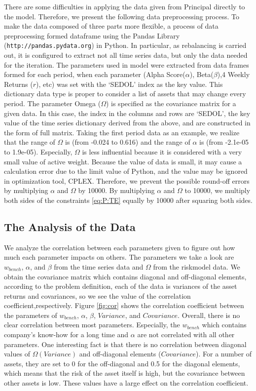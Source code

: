 \documentclass[11pt]{article}
\begin{document}
	There are some difficulties in applying the data given from Principal directly to the model. Therefore, we present the following data preprocessing process. To make the data composed of three parts more flexible, a process of data preprocessing formed dataframe using the Pandas Library (\texttt{http://pandas.pydata.org}) in Python. In particular, as rebalancing is carried out, it is configured to extract not all time series data, but only the data needed for the iteration. The parameters used in model were extracted from data frames formed for each period, when each parameter (Alpha Score($\alpha$), Beta($\beta$),4 Weekly Returns ($r$), etc) was set with the `SEDOL' index as the key value. This dictionary data type is proper to consider a list of assets that may change every period. The parameter Omega ($ \Omega $) is specified as the covariance matrix for a given data. In this case, the index in the columns and rows are `SEDOL', the key value of the time series dictionary derived from the above, and are constructed in the form of full matrix. Taking the first period data as an example, we realize that the range of $\Omega$ is (from -0.024 to 0.616) and the range of $\alpha$ is (from -2.1e-05 to 1.9e-05). Especially, $\Omega$ is less influential because it is considered with a very small value of active weight. Because the value of data is small, it may cause a calculation error due to the limit value of Python, and the value may be ignored in optimization tool, CPLEX. Therefore, we prevent the possible round-off errors by multiplying $\alpha$ and $\Omega$ by 10000. By multiplying $\alpha$ and $\Omega$ to 10000, we multiply both sides of the constraints \eqref{eq:P:TE} equally by 10000 after squaring both sides.
	
\subsection{The Analysis of the Data}
	We analyze the correlation between each parameters given to figure out how much each parameter impacts on others. The parameters we take a look are $w_{bench}$, $\alpha$, and $\beta$ from the time series data and $\Omega$ from the riskmodel data. We obtain the covariance matrix which contains diagonal and off-diagonal elements, according to the problem definition, each of the data is variances of the asset returns and covariances, so we see the value of the correlation coefficient,respectively.  
	Figure \ref{fig:cor} shows the correlation coefficient between the parameters of $w_{bench}$, $\alpha$, $\beta$, $Variance$, and $Covariance$. Overall, there is no clear correlation between most parameters. Especially, the $w_{bench}$ which contains company's know-how for a long time and $\alpha$ are not correlated with all other parameters. One interesting fact is that there is no correlation between diagonal values of $ \Omega (Variance) $ and off-diagonal elements ($ Covariance $). For a number of assets, they are set to 0 for the off-diagonal and 0.5 for the diagonal elements, which means that the risk of the asset itself is high, but the covariance between other assets is low. These values have a large effect on the correlation coefficient.
	
\end{document}
